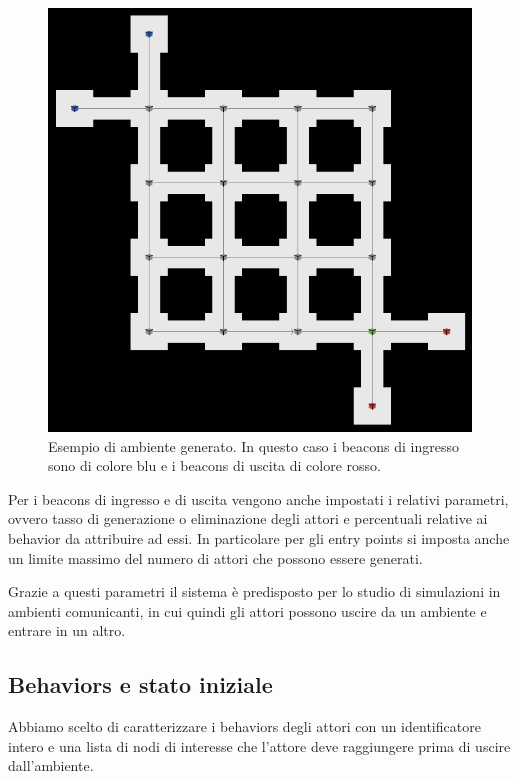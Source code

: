 \begin{figure}[htbp]
\centering
\includegraphics[width=\textwidth,height=\textheight,keepaspectratio]{images/ambiente-screen.png}
\caption{Esempio di ambiente generato. In questo caso i beacons di ingresso sono di colore blu e i beacons di uscita di colore rosso.}
\label{fig:ambiente-screen}
\end{figure}
Per i beacons di ingresso e di uscita vengono anche impostati i relativi parametri, ovvero tasso di generazione o eliminazione degli attori e percentuali relative ai behavior da attribuire ad essi. In particolare per gli entry points si imposta anche un limite massimo del numero di attori che possono essere generati.

Grazie a questi parametri il sistema è predisposto per lo studio di simulazioni in ambienti comunicanti, in cui quindi gli attori possono uscire da un ambiente e entrare in un altro. 

\subsection{Behaviors e stato iniziale}
Abbiamo scelto di caratterizzare i behaviors degli attori con un identificatore intero e una lista di nodi di interesse che l'attore deve raggiungere prima di uscire dall'ambiente.

